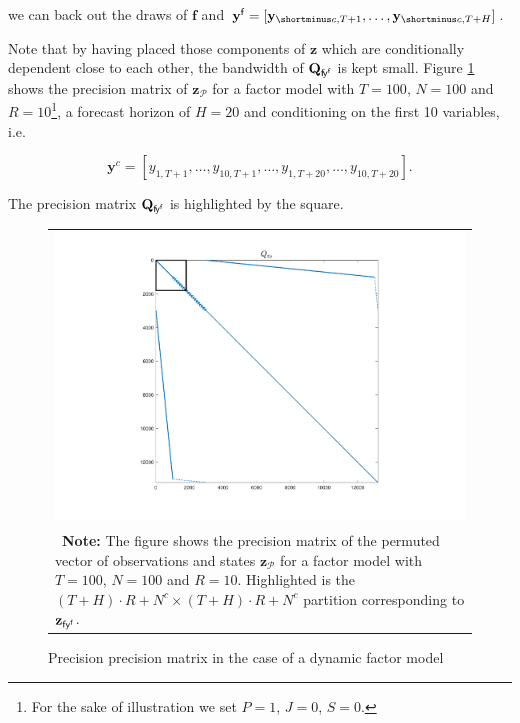 \documentclass[notitlepage,a4paper,12pt]{article}
\begin{document}
we can back out the draws of $\mathbf{f}$ and $\mathbf{y}^{\sf{f}} = [\mathbf{y}_{\shortminus c, T+1}, \dots, \mathbf{y}_{\shortminus c, T+H}]$.

Note that by having placed those components of $\mathbf{z}$ which are conditionally dependent close to each other, the bandwidth of $\mathbf{Q}_{\sf{f}\! y^{\sf{f}}}$ is kept small. Figure \ref{figQDFM} shows the precision matrix of $\mathbf{z}_{\mathcal{P}}$ for a factor model with $T=100$, $N=100$ and $R=10$\footnote{For the sake of illustration we set $P=1$, $J=0$, $S=0$.}, a forecast horizon of $H=20$ and conditioning on the first 10 variables, i.e.

$$
\mathbf{y}^c = [y_{1,T+1}, \dots, y_{10,T+1}, \dots, y_{1,T+20}, \dots, y_{10,T+20}].
$$

The precision matrix $\mathbf{Q}_{\sf{f}\! y^{\sf{f}}}$ is highlighted by the square.

\begin{figure}[htbp] \centering
    \caption{Precision precision matrix in the case of a dynamic factor model \label{figQDFM}}
    \footnotesize
    \begin{tabular}{p{16cm}}
    \multicolumn{1}{c}{\includegraphics*[scale = 0.6]{../figures/fig_Qperm_DFM.pdf}} \\
    {
    \footnotesize \textbf{Note:} The figure shows the precision matrix of the permuted vector of observations and states $\mathbf{z}_{\mathcal{P}}$ for a factor model with $T=100$, $N=100$ and $R=10$. Highlighted is the $(T+H)\cdot R + N^c \times (T+H) \cdot R + N^c$ partition corresponding to $\mathbf{z}_{\sf{f} y^{\sf{f}}}$.  
    }
    \end{tabular}
    \newline
    \normalsize
\end{figure}
\end{document}
